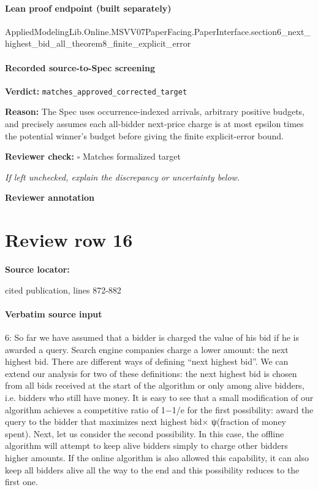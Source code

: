 \documentclass[10pt]{article}
\newcommand{\reviewerbox}{%
  \par\noindent\fbox{\parbox{0.96\linewidth}{\rule{0pt}{0.38in}}}\par
}
\newcommand{\reviewmatch}[1]{%
  \par\noindent\textbf{Reviewer check:} $\square$\; #1\par
  \noindent\emph{If left unchecked, explain the discrepancy or uncertainty below.}\par
}
\begin{document}
\paragraph{Lean proof endpoint (built separately)}\begin{ReviewVerbatim}
AppliedModelingLib.Online.MSVV07PaperFacing.PaperInterface.section6_next_highest_bid_all_theorem8_finite_explicit_error
\end{ReviewVerbatim}

\paragraph{Recorded source-to-Spec screening}
\textbf{Verdict:} \texttt{matches\_approved\_corrected\_target}
\\
{\raggedright
\textbf{Reason:} The Spec uses occurrence-\allowbreak{}indexed arrivals, arbitrary positive budgets, and precisely assumes each all-\allowbreak{}bidder next-\allowbreak{}price charge is at most epsilon times the potential winner's budget before giving the finite explicit-\allowbreak{}error bound.\allowbreak{}
\par}
\reviewmatch{Matches formalized target}
\noindent\textbf{Reviewer annotation}\par
\reviewerbox
\clearpage
\hypertarget{source-claim-4aacac29617d89c4}{}
\section*{Review row 16}
\textbf{Source locator:} {\footnotesize\raggedright cited publication, lines 872-\allowbreak{}882\par}
\paragraph{Verbatim source input}
\begin{ReviewVerbatim}
6: So far we have assumed that a bidder is charged the value of his bid if he is awarded a query.
Search engine companies charge a lower amount: the next highest bid. There are different ways
of defining “next highest bid”. We can extend our analysis for two of these definitions: the
next highest bid is chosen from all bids received at the start of the algorithm or only among
alive bidders, i.e. bidders who still have money.
It is easy to see that a small modification of our algorithm achieves a competitive ratio of
1−1/e for the first possibility: award the query to the bidder that maximizes next highest bid×
ψ(fraction of money spent). Next, let us consider the second possibility. In this case, the offline
algorithm will attempt to keep alive bidders simply to charge other bidders higher amounts.
If the online algorithm is also allowed this capability, it can also keep all bidders alive all the
way to the end and this possibility reduces to the first one.
\end{ReviewVerbatim}
\end{document}

